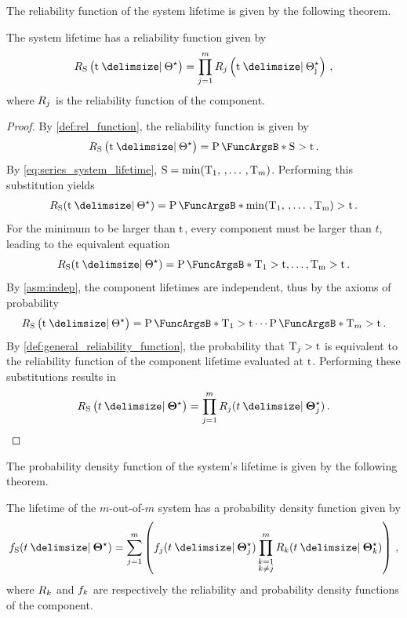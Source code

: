 \documentclass[
    11pt,
    extrafontsizes,
    article,
    oldfontcommands,
    final,
    oneside,
    openany,
    hidelinks]{memoir}
\begin{document}
The reliability function of the system lifetime is given by the following 
theorem.
\begin{theorem}
\label{thm:series_reliability_function}
The system lifetime has a reliability function given by
\begin{equation}
\label{eq:series_reliability_function}
    \srv_{\sv}\left(\ti \Given \tparam\sysparam\right) = \prod_{j=1}^{m} \srv_j\left(\ti \Given \tparam\sysparam_j\right)\,,
\end{equation}
where $R_j$ is the reliability function of the \jth component.
\end{theorem}
\begin{proof}
By \cref{def:rel_function}, the reliability function is given by
\begin{equation}
    \srv_{\sv}\left(\ti \Given \tparam\sysparam\right) = \Prob{\sv > \ti}\,.
\end{equation}
By \cref{eq:series_system_lifetime}, $\mathrm{S} = \min(\mathrm{T}_1,\,,\ldots\,,\mathrm{T}_m)$. Performing this substitution yields
\begin{align}
    \srv_{\sv}(\ti \Given \tparam{\sysparam}) = \Prob{\min(\cv_1,\,,\ldots\,, \cv_m) > \ti}\,.
\end{align}
For the minimum to be larger than $\rm{t}$, every component must be larger than $t$, leading to the equivalent equation
\begin{equation}
    \srv_{\sv}(\ti \Given \tparam{\sysparam}) = \Prob{\cv_1 > \ti, \ldots, \cv_m > \ti}\,.
\end{equation}
By \cref{asm:indep}, the component lifetimes are independent, thus by the axioms of probability
\begin{equation}
    \srv_{\sv}\left(\ti \Given \tparam{\sysparam}\right) = \Prob{\cv_1 > \ti} \cdots \Prob{\cv_m > \ti}\,.
\end{equation}
By \cref{def:general_reliability_function}, the probability that $\mathrm{T}_j > \rm{t}$ is equivalent to the reliability function of the \jth component lifetime evaluated at $\rm{t}$. Performing these substitutions results in
\begin{equation}
    \srv_{\sv}\left(t \Given \tparam{\sysparam}\right) = \prod_{j=1}^{m} \srv_j(t \Given \tparam{\sysparam}_j)\,.
\end{equation}
\end{proof}
The probability density function of the system's lifetime is given by the following theorem.
\begin{theorem}
\label{thm:series_pdf_function}
The lifetime of the $m$-out-of-$m$ system has a probability density function given by
\begin{equation}
\label{eq:series_pdf_function}
    \spdf(t \Given \tparam\sysparam) = \sum_{j=1}^{m} \left(\pdf_j(t \Given \tparam{\sysparam}_j)
    \prod_{\substack{k=1\\k \neq j}}^{m} \srv_k(t \Given \tparam{\sysparam}_k)\right )\,,
\end{equation}
where $R_k$ and $f_k$ are respectively the reliability and probability 
density functions of the \kth component.
\end{theorem}
\end{document}
